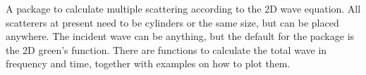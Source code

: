 A package to calculate multiple scattering according to the 2D wave equation. All scatterers at present need to be cylinders or the same size, but can be placed anywhere. The incident wave can be anything, but the default for the package is the 2D green's function. There are functions to calculate the total wave in frequency and time, together with examples on how to plot them. 
